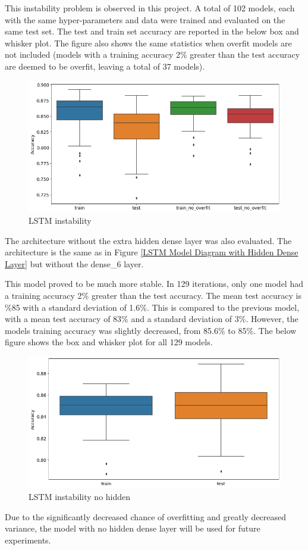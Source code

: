 \documentclass[12pt]{article}
\begin{document}
This instability problem is observed in this project. A total of 102 models, each with the same hyper-parameters and data were trained and evaluated on the same test set. The test and train set accuracy are reported in the below box and whisker plot. The figure also shows the same statistics when overfit models are not included (models with a training accuracy 2\% greater than the test accuracy are deemed to be overfit, leaving a total of 37 models).

\begin{figure}[H]
\centering\caption{LSTM instability}
\includegraphics[scale=0.52]{LSTM instability.png}
\end{figure}
The architecture without the extra hidden dense layer was also evaluated. The architecture is the same as in Figure \ref{LSTM Model Diagram with Hidden Dense Layer} but without the dense\_6 layer. 

This model proved to be much more stable. In 129 iterations, only one model had a training accuracy 2\% greater than the test accuracy. The mean test accuracy is \%85 with a standard deviation of 1.6\%. This is compared to the previous model, with a mean test accuracy of 83\% and a standard deviation of 3\%. However, the models training accuracy was slightly decreased, from 85.6\% to 85\%. The below figure shows the box and whisker plot for all 129 models.

\begin{figure}[H]
\centering\caption{LSTM instability no hidden}
\includegraphics[scale=0.52]{LSTM instability no hidden.png}
\end{figure}
Due to the significantly decreased chance of overfitting and greatly decreased variance, the model with no hidden dense layer will be used for future experiments. 
\end{document}
